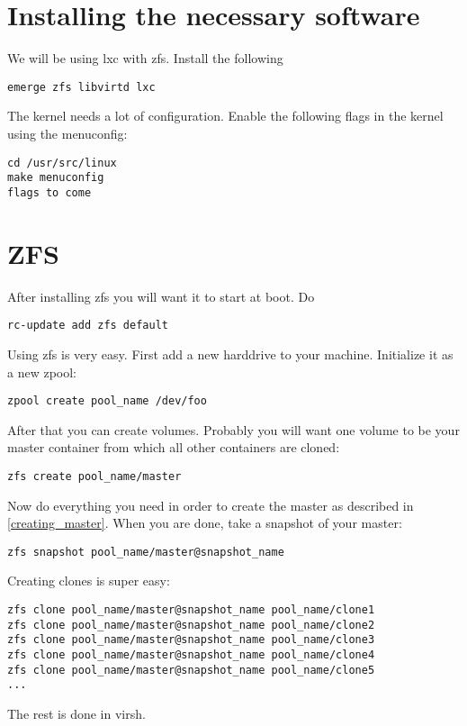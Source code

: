 \documentclass[a4paper]{book}
\begin{document}
\tableofcontents

\chapter{Installing the necessary software}
We will be using lxc with zfs. Install the following
\begin{verbatim}
emerge zfs libvirtd lxc
\end{verbatim}
The kernel needs a lot of configuration. Enable the following flags in the kernel using the menuconfig:
\begin{verbatim}
cd /usr/src/linux
make menuconfig
flags to come
\end{verbatim}

\chapter{ZFS}
After installing zfs you will want it to start at boot. Do
\begin{verbatim}
rc-update add zfs default
\end{verbatim}
Using zfs is very easy. First add a new harddrive to your machine. Initialize it as a new zpool:
\begin{verbatim}
zpool create pool_name /dev/foo
\end{verbatim}
After that you can create volumes. Probably you will want one volume to be your master container from which all other containers are cloned:
\begin{verbatim}
zfs create pool_name/master
\end{verbatim}
Now do everything you need in order to create the master as described in \autoref{creating_master}. When you are done, take a snapshot of your master:
\begin{verbatim}
zfs snapshot pool_name/master@snapshot_name
\end{verbatim}
Creating clones is super easy:
\begin{verbatim}
zfs clone pool_name/master@snapshot_name pool_name/clone1
zfs clone pool_name/master@snapshot_name pool_name/clone2
zfs clone pool_name/master@snapshot_name pool_name/clone3
zfs clone pool_name/master@snapshot_name pool_name/clone4
zfs clone pool_name/master@snapshot_name pool_name/clone5
...
\end{verbatim}
The rest is done in virsh.
\end{document}

